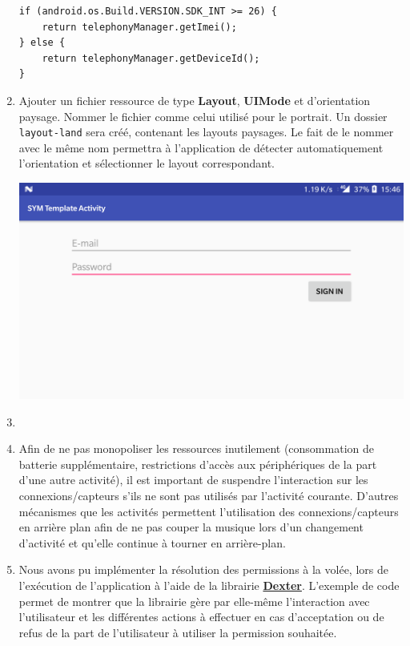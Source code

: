 \documentclass[a4paper]{article}
\begin{document}
\begin{enumerate}
    \begin{lstlisting}
if (android.os.Build.VERSION.SDK_INT >= 26) {
    return telephonyManager.getImei();
} else {
    return telephonyManager.getDeviceId();
}
    \end{lstlisting}
    
    \item Ajouter un fichier ressource de type \textbf{Layout}, \textbf{UIMode} et d'orientation paysage. Nommer le fichier comme celui utilisé pour le portrait. Un dossier \texttt{layout-land} sera créé, contenant les layouts paysages. Le fait de le nommer avec le même nom permettra à l'application de détecter automatiquement l'orientation et sélectionner le layout correspondant.
    
    \begin{minipage}{\linewidth}
    	\centering
    	\includegraphics[width=0.6\linewidth]{images/landscape_screen.png}
    \end{minipage}
    
    \item 
    
    \item Afin de ne pas monopoliser les ressources inutilement (consommation de batterie supplémentaire, restrictions d'accès aux périphériques de la part d'une autre activité), il est important de suspendre l'interaction sur les connexions/capteurs s'ils ne sont pas utilisés par l'activité courante. D'autres mécanismes que les activités permettent l'utilisation des connexions/capteurs en arrière plan afin de ne pas couper la musique lors d'un changement d'activité et qu'elle continue à tourner en arrière-plan.
    
    \item Nous avons pu implémenter la résolution des permissions à la volée, lors de l'exécution de l'application à l'aide de la librairie \href{https://github.com/Karumi/Dexter}{\textbf{Dexter}}. L'exemple de code permet de montrer que la librairie gère par elle-même l'interaction avec l'utilisateur et les différentes actions à effectuer en cas d'acceptation ou de refus de la part de l'utilisateur à utiliser la permission souhaitée.
    

\end{enumerate}
\end{document}
